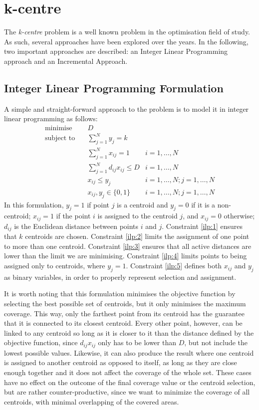 \section{k-centre}
The \emph{k-centre} problem is a well known problem in the optimisation field of study. As such, several approaches have been explored over the years. In the following, two important approaches are described: an Integer Linear Programming approach and an Incremental Approach.

\subsection{Integer Linear Programming Formulation}
\label{alg:ilp}

A simple and straight-forward approach to the problem is to model it in  integer linear programming as follows:
\begin{align}
\text{minimise}   \quad& D							   &\\
\text{subject to} \quad
& \sum\limits_{j=1}^{N}{y_j} = k 
& 							\label{ilp:1}\\
& \sum\limits_{j=1}^{N}{x_{ij}}	= 1   
& i=1,\ldots,N 				\label{ilp:2}\\
& \sum\limits_{j=1}^{N}{d_{ij} x_{ij}} \leq D
& i=1,\ldots,N				\label{ilp:3}\\
& x_{ij} \leq y_{j}				   
& i=1,\ldots,N;j=1,\ldots,N	\label{ilp:4}\\
& x_{ij},y_{j} \in \{0,1\}
& i=1,\ldots,N;j=1,\ldots,N \label{ilp:5}
\end{align}
In this formulation, $y_j = 1$ if point $j$ is a centroid and $y_j = 0$ if it is a non-centroid;
$x_{ij} = 1$ if the point $i$ is assigned to the centroid $j$, and $x_{ij}=0$ otherwise;
$d_{ij}$ is the Euclidean distance between points $i$ and $j$.
Constraint \eqref{ilp:1} ensures that $k$ centroids are chosen.
Constraint \eqref{ilp:2} limits the assignment of one point to more than one centroid.
Constraint \eqref{ilp:3} ensures that all active distances are lower than the limit we are minimising.
Constraint \eqref{ilp:4} limits points to being assigned only to centroids, where $y_j=1$.
Constraint \eqref{ilp:5} defines both $x_{ij}$ and $y_j$ as binary variables, in order to properly represent selection and assignment.

It is worth noting that this formulation minimises the objective function by selecting the best possible set of centroids, but it only minimises the maximum coverage. This way, only the farthest point from its centroid has the guarantee that it is connected to its closest centroid.
Every other point, however, can be linked to any centroid so long as it is closer to it than the distance defined by the objective function, since $d_{ij}x_{ij}$ only has to be lower than $D$, but not include the lowest possible values.
Likewise, it can also produce the result where one centroid is assigned to another centroid as opposed to itself, as long as they are close enough together and it does not affect the coverage of the whole set.
These cases have no effect on the outcome of the final coverage value or the centroid selection, but are rather counter-productive, since we want to minimize the coverage of all centroids, with minimal overlapping of the covered areas.

